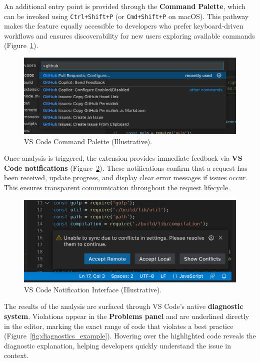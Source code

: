 \begin{spacing}{1.2}
An additional entry point is provided through the \textbf{Command Palette}, which can be invoked using \texttt{Ctrl+Shift+P} (or \texttt{Cmd+Shift+P} on macOS). This pathway makes the feature equally accessible to developers who prefer keyboard-driven workflows and ensures discoverability for new users exploring available commands (Figure~\ref{fig:command_palette_example}).

\begin{figure}[H]
    \centering
    \includegraphics[scale=0.5]{Images/command_palette.png}
    \caption{VS Code Command Palette (Illustrative).}
    \label{fig:command_palette_example}
\end{figure}


Once analysis is triggered, the extension provides immediate feedback via \textbf{VS Code notifications} (Figure~\ref{fig:notification_example}). These notifications confirm that a request has been received, update progress, and display clear error messages if issues occur. This ensures transparent communication throughout the request lifecycle.

\begin{figure}[H]
    \centering
    \includegraphics[scale=0.8]{Images/vscode_notification.png}
    \caption{VS Code Notification Interface (Illustrative).}
    \label{fig:notification_example}
\end{figure}

The results of the analysis are surfaced through VS Code’s native \textbf{diagnostic system}. Violations appear in the \textbf{Problems panel} and are underlined directly in the editor, marking the exact range of code that violates a best practice (Figure~\ref{fig:diagnostics_example}). Hovering over the highlighted code reveals the diagnostic explanation, helping developers quickly understand the issue in context.


\end{spacing}

